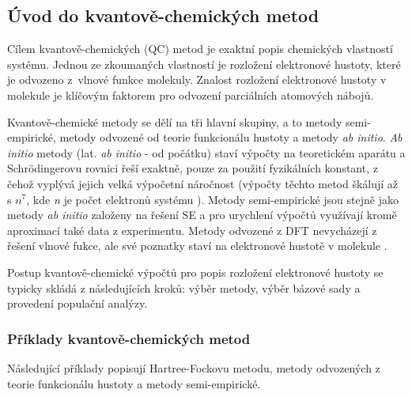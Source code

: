 \subsection{Úvod do kvantově-chemických metod}
Cílem kvantově-chemických (QC) metod je exaktní popis chemických vlastností systému. Jednou ze zkoumaných vlastností je rozložení elektronové hustoty, které je odvozeno z~vlnové funkce molekuly. Znalost rozložení elektronové hustoty v molekule je klíčovým faktorem pro odvození parciálních atomových nábojů.

Kvantově-chemické metody se dělí na tři hlavní skupiny, a to metody semi-empiric\-ké, metody odvozené od teorie funkcionálu hustoty a metody \textit{ab initio}. \textit{Ab initio} metody (lat. \textit{ab initio} - od počátku) staví výpočty na teoretickém aparátu a Schrödingerovu rovnici řeší exaktně, pouze za použití fyzikálních konstant, z čehož vyplývá jejich velká výpočetní náročnost (výpočty těchto metod škálují až s $n^7$, kde \textit{n} je počet elektronů systému \cite{qc_complexity}). Metody semi-empirické jsou stejně jako metody \textit{ab initio} založeny na řešení SE a pro urychlení výpočtů využívají kromě aproximací také data z experimentu. Metody odvozené z DFT nevycházejí z řešení vlnové fukce, ale své poznatky staví na elektronové hustotě v molekule \cite{Leach, Gasteiger:Textbook, Cramer}. %

Postup kvantově-chemické výpočtů pro popis rozložení elektronové hustoty se typicky skládá z následujících kroků: výběr metody, výběr bázové sady a provedení populační analýzy.

\subsubsection{Příklady kvantově-chemických metod}
Následující příklady popisují Hartree-Fockovu metodu, metody odvozených z teorie funkcionálu hustoty a metody semi-empirické.

